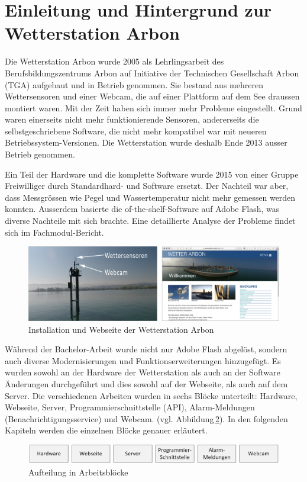 \section*{Einleitung und Hintergrund zur Wetterstation Arbon}

Die Wetterstation Arbon wurde 2005 als Lehrlingsarbeit des Berufsbildungszentrums Arbon auf Initiative der Technischen Gesellschaft Arbon (TGA) aufgebaut und in Betrieb genommen. Sie bestand aus mehreren Wettersensoren und einer Webcam, die auf einer Plattform auf dem See draussen montiert waren. Mit der Zeit haben sich immer mehr Probleme eingestellt. Grund waren einerseits nicht mehr funktionierende Sensoren, andererseits die selbstgeschriebene Software, die nicht mehr kompatibel war mit neueren Betriebssystem-Versionen. Die Wetterstation wurde deshalb Ende 2013 ausser Betrieb genommen.

Ein Teil der Hardware und die komplette Software wurde 2015 von einer Gruppe Freiwilliger durch Standardhard- und Software ersetzt. Der Nachteil war aber, dass Messgrössen wie Pegel und Wassertemperatur nicht mehr gemessen werden konnten. Ausserdem basierte die of-the-shelf-Software auf Adobe Flash, was diverse Nachteile mit sich brachte. Eine detaillierte Analyse der Probleme findet sich im Fachmodul-Bericht\cite{BilWie2018MUIu}.

\vspace{5mm} %
\begin{figure}[htbp!]
	\centering
	\includegraphics[width=1\linewidth]{img/kombi}
	\caption{Installation und Webseite der Wetterstation Arbon}
	\label{img:wetterstation}
\end{figure}
\vspace{3mm} %

\noindent
Während der Bachelor-Arbeit wurde nicht nur Adobe Flash abgelöst, sondern auch diverse Modernisierungen und Funktionserweiterungen hinzugefügt. Es wurden sowohl an der Hardware der Wetterstation als auch an der Software Änderungen durchgeführt und dies sowohl auf der Webseite, als auch auf dem Server. Die verschiedenen Arbeiten wurden in sechs Blöcke unterteilt: Hardware, Webseite, Server, Programmierschnittstelle (API), Alarm-Meldungen (Benachrichtigungsservice) und Webcam. (vgl. Abbildung\,\ref{img:module}). In den folgenden Kapiteln werden die einzelnen Blöcke genauer erläutert.

\vspace{5mm} %
\begin{figure}[htbp!]
	\centering
	\includegraphics[width=1\linewidth]{img/module}
	\caption{Aufteilung in Arbeitsblöcke}
	\label{img:module}
\end{figure}
\newpage
